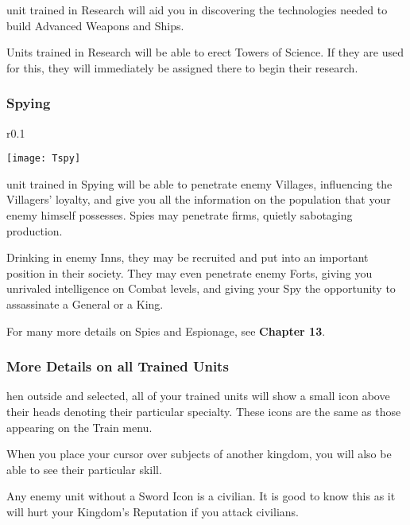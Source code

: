  unit trained in Research will aid you in discovering the technologies needed to build Advanced Weapons and Ships.

Units trained in Research will be able to erect Towers of Science. If they are used for this, they will immediately be assigned there to begin their research.

\subsubsection{\textsf{Spying}}


\begin{wrapfigure}{r}{0.1\textwidth}
    \vspace{-20pt}
    \begin{center}
        \texttt{[image: Tspy]}
    \end{center}
    \vspace{-20pt}
\end{wrapfigure}

 unit trained in Spying will be able to penetrate enemy Villages, influencing the Villagers’ loyalty, and give you all the information on the population that your enemy himself possesses. Spies may penetrate firms, quietly sabotaging production.


Drinking in enemy Inns, they may be recruited and put into an important position in their society. They may even penetrate enemy Forts, giving you unrivaled intelligence on Combat levels, and giving your Spy the opportunity to assassinate a General or a King. 

For many more details on Spies and Espionage, see \textbf{Chapter 13}.

\subsubsection{\textsf{More Details on all Trained Units}}

hen outside and selected, all of your trained units will show a small icon above their heads denoting their particular specialty. These icons are the same as those appearing on the Train menu.

When you place your cursor over subjects of another kingdom, you will also be able to see their particular skill.

Any enemy unit without a Sword Icon is a civilian. It is good to know this as it will hurt your Kingdom’s Reputation if you attack civilians.

